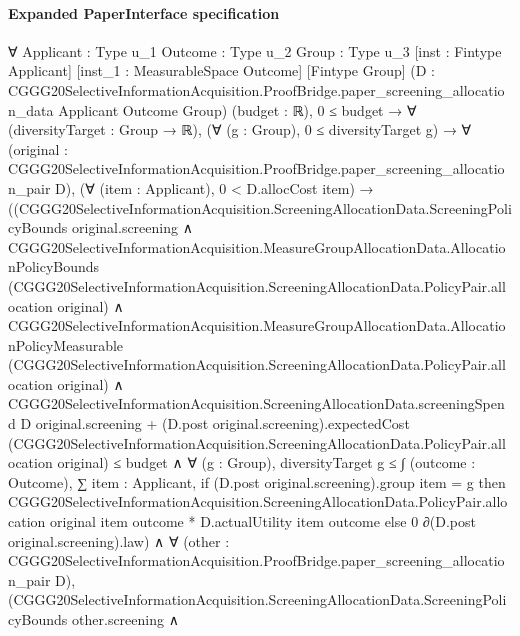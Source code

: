 \documentclass[10pt]{article}
\begin{document}
\paragraph{Expanded PaperInterface specification}
\begin{ReviewVerbatim}
∀ {Applicant : Type u_1} {Outcome : Type u_2} {Group : Type u_3} [inst : Fintype Applicant]
  [inst_1 : MeasurableSpace Outcome] [Fintype Group]
  (D : CGGG20SelectiveInformationAcquisition.ProofBridge.paper_screening_allocation_data Applicant Outcome Group)
  (budget : ℝ),
  0 ≤ budget →
    ∀ (diversityTarget : Group → ℝ),
      (∀ (g : Group), 0 ≤ diversityTarget g) →
        ∀ (original : CGGG20SelectiveInformationAcquisition.ProofBridge.paper_screening_allocation_pair D),
          (∀ (item : Applicant), 0 < D.allocCost item) →
            ((CGGG20SelectiveInformationAcquisition.ScreeningAllocationData.ScreeningPolicyBounds original.screening ∧
                  CGGG20SelectiveInformationAcquisition.MeasureGroupAllocationData.AllocationPolicyBounds
                      (CGGG20SelectiveInformationAcquisition.ScreeningAllocationData.PolicyPair.allocation original) ∧
                    CGGG20SelectiveInformationAcquisition.MeasureGroupAllocationData.AllocationPolicyMeasurable
                        (CGGG20SelectiveInformationAcquisition.ScreeningAllocationData.PolicyPair.allocation original) ∧
                      CGGG20SelectiveInformationAcquisition.ScreeningAllocationData.screeningSpend D
                              original.screening +
                            (D.post original.screening).expectedCost
                              (CGGG20SelectiveInformationAcquisition.ScreeningAllocationData.PolicyPair.allocation
                                original) ≤
                          budget ∧
                        ∀ (g : Group),
                          diversityTarget g ≤
                            ∫ (outcome : Outcome),
                              ∑ item : Applicant,
                                if (D.post original.screening).group item = g then
                                  CGGG20SelectiveInformationAcquisition.ScreeningAllocationData.PolicyPair.allocation
                                      original item outcome *
                                    D.actualUtility item outcome
                                else 0 ∂(D.post original.screening).law) ∧
                ∀ (other : CGGG20SelectiveInformationAcquisition.ProofBridge.paper_screening_allocation_pair D),
                  (CGGG20SelectiveInformationAcquisition.ScreeningAllocationData.ScreeningPolicyBounds other.screening ∧

\end{ReviewVerbatim}
\end{document}
